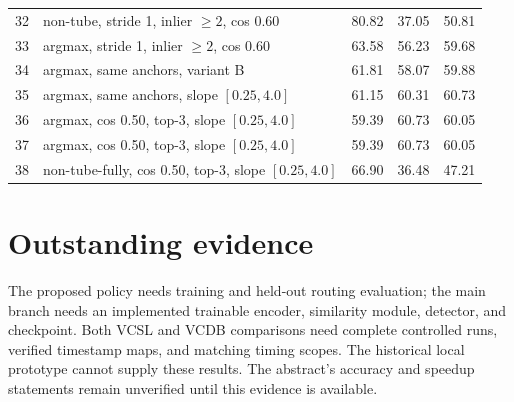 \documentclass[10pt,twocolumn,letterpaper]{article}
\begin{document}
\begin{table}[t]
\begin{tabular}{@{}r>{\raggedright\arraybackslash}p{8.2cm}rrr@{}}
32 & non-tube, stride 1, inlier $\ge2$, cos 0.60 & 80.82 & 37.05 & 50.81 \\
33 & argmax, stride 1, inlier $\ge2$, cos 0.60 & 63.58 & 56.23 & 59.68 \\
34 & argmax, same anchors, variant B & 61.81 & 58.07 & 59.88 \\
35 & argmax, same anchors, slope $[0.25,4.0]$ & 61.15 & 60.31 & 60.73 \\
36 & argmax, cos 0.50, top-3, slope $[0.25,4.0]$ & 59.39 & 60.73 & 60.05 \\
37 & argmax, cos 0.50, top-3, slope $[0.25,4.0]$ & 59.39 & 60.73 & 60.05 \\
38 & non-tube-fully, cos 0.50, top-3, slope $[0.25,4.0]$ & 66.90 & 36.48 & 47.21 \\
\bottomrule
\end{tabular}
\end{table}

\section{Outstanding evidence}
The proposed policy needs training and held-out routing evaluation; the main branch needs
an implemented trainable encoder, similarity module, detector, and checkpoint. Both VCSL
and VCDB comparisons need complete controlled runs, verified timestamp maps, and matching
timing scopes. The historical local prototype cannot supply these results. The abstract's
accuracy and speedup statements remain unverified until this evidence is available.
\end{document}
